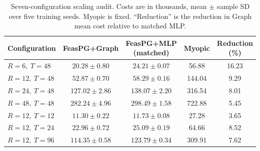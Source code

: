 \begin{table}[ht]
\caption{Seven-configuration scaling audit.  Costs are in thousands, mean
$\pm$ sample SD over five training seeds. Myopic is fixed.  ``Reduction'' is
the reduction in Graph mean cost relative to matched MLP.}
\label{tab:scaling-complete}
\centering
\scriptsize
\setlength{\tabcolsep}{3.3pt}
\begin{tabular}{@{}lcccc@{}}
\toprule
Configuration & FeasPG+Graph & FeasPG+MLP (matched) & Myopic & Reduction (\%)\\
\midrule
$R=6,\ T=48$ & $20.28\pm0.80$ & $24.21\pm0.07$ & 56.88 & 16.23\\
$R=12,\ T=48$ & $52.87\pm0.70$ & $58.29\pm0.16$ & 144.04 & 9.29\\
$R=24,\ T=48$ & $127.02\pm2.86$ & $138.07\pm2.20$ & 316.54 & 8.01\\
$R=48,\ T=48$ & $282.24\pm4.96$ & $298.49\pm1.58$ & 722.88 & 5.45\\
$R=12,\ T=12$ & $11.30\pm0.22$ & $11.73\pm0.08$ & 27.28 & 3.65\\
$R=12,\ T=24$ & $22.96\pm0.72$ & $25.09\pm0.19$ & 64.66 & 8.52\\
$R=12,\ T=96$ & $114.35\pm0.58$ & $123.79\pm0.34$ & 309.91 & 7.62\\
\bottomrule
\end{tabular}
\end{table}
